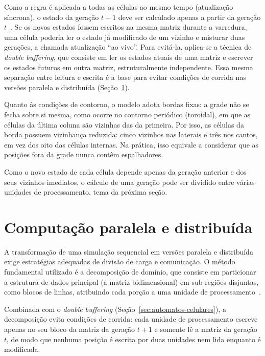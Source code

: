 Como a regra é aplicada a todas as células ao mesmo tempo (atualização síncrona), o estado da geração $t+1$ deve ser calculado apenas a partir da geração $t$~\cite{BertoTagliabue2023}. Se os novos estados fossem escritos na mesma matriz durante a varredura, uma célula poderia ler o estado já modificado de um vizinho e misturar duas gerações, a chamada atualização ``ao vivo''. Para evitá-la, aplica-se a técnica de \textit{double buffering}, que consiste em ler os estados atuais de uma matriz e escrever os estados futuros em outra matriz, estruturalmente independente. Essa mesma separação entre leitura e escrita é a base para evitar condições de corrida nas versões paralela e distribuída (Seção~\ref{sec:computacao-paralela}).

Quanto às condições de contorno, o modelo adota bordas fixas: a grade não se fecha sobre si mesma, como ocorre no contorno periódico (toroidal), em que as células da última coluna são vizinhas das da primeira. Por isso, as células da borda possuem vizinhança reduzida: cinco vizinhos nas laterais e três nos cantos, em vez dos oito das células internas. Na prática, isso equivale a considerar que as posições fora da grade nunca contêm espalhadores.

Como o novo estado de cada célula depende apenas da geração anterior e dos seus vizinhos imediatos, o cálculo de uma geração pode ser dividido entre várias unidades de processamento, tema da próxima seção.

\section{Computação paralela e distribuída}\label{sec:computacao-paralela}

A transformação de uma simulação sequencial em versões paralela e distribuída exige estratégias adequadas de divisão de carga e comunicação. O método fundamental utilizado é a decomposição de domínio, que consiste em particionar a estrutura de dados principal (a matriz bidimensional) em sub-regiões disjuntas, como blocos de linhas, atribuindo cada porção a uma unidade de processamento~\cite{Foster1995,Pacheco2011}.

Combinada com o \textit{double buffering} (Seção~\ref{sec:automatos-celulares}), a decomposição evita condições de corrida: cada unidade de processamento escreve apenas no seu bloco da matriz da geração $t+1$ e somente lê a matriz da geração $t$, de modo que nenhuma posição é escrita por duas unidades nem lida enquanto é modificada.

